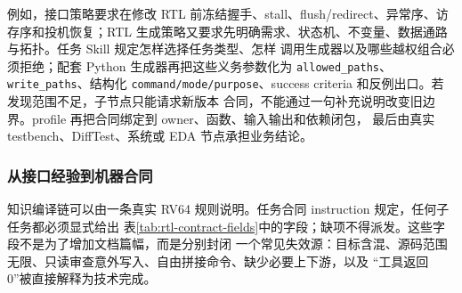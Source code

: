 \documentclass[UTF8,a4paper,zihao=-4,oneside]{ctexart}
\begin{document}
例如，接口策略要求在修改 RTL 前冻结握手、stall、flush/redirect、异常序、访存序和投机恢复；RTL
生成策略又要求先明确需求、状态机、不变量、数据通路与拓扑。任务 Skill 规定怎样选择任务类型、怎样
调用生成器以及哪些越权组合必须拒绝；配套 Python 生成器再把这些义务参数化为
\texttt{allowed\_paths}、\texttt{write\_paths}、结构化
\texttt{command/mode/purpose}、success criteria 和反例出口。若发现范围不足，子节点只能请求新版本
合同，不能通过一句补充说明改变旧边界。profile 再把合同绑定到 owner、函数、输入输出和依赖闭包，
最后由真实 testbench、DiffTest、系统或 EDA 节点承担业务结论。

\newcommand{\TableKnowledgeCompilation}{%
\begin{table}[htbp]
  \centering
  \small
  \caption{专业知识载体在编译链中的分工}
  \label{tab:knowledge-compilation}
  \begin{tabularx}{\linewidth}{@{}L{0.17\linewidth}L{0.28\linewidth}L{0.27\linewidth}Y@{}}
    \toprule
    载体 & 编码的问题 & 进入下一节点的方式 & 单独不能证明什么 \\
    \midrule
    instruction/spec & 架构、接口、Linux 层级、CPI/PPA 全序等不变量 & 由分类与路径选择，并被合同字段、assertion 或 checker 机械化 & 文件存在不等于规则被执行 \\
    Skill & 某类任务的可复用操作、参数、模板和反例出口 & 规定生成、校验、渲染的次序及失败出口 & Skill 自测不等于 DUT 正确 \\
    machine contract & 本轮对象、路径、命令、上下文、成功条件和边界 & 作为 Agent 节点唯一授权与审查基准 & 合同完整不等于工具已经运行 \\
    profile/E2E & 节点 owner、依赖、函数、输入输出和端到端完成条件 & 递归展开闭包并逐节点执行、留证 & 图可展开不等于业务门通过 \\
    oracle/mutation & 如何把 raw observation 转为限定裁决 & 生成正向结果、唯一拒绝 marker 与 receipt & 给定 fault set 被杀死不等于全状态空间完备 \\
    \bottomrule
  \end{tabularx}
\end{table}
}%

\subsubsection{从接口经验到机器合同}

知识编译链可以由一条真实 RV64 规则说明。任务合同 instruction 规定，任何子任务都必须显式给出
表\ref{tab:rtl-contract-fields}中的字段；缺项不得派发。这些字段不是为了增加文档篇幅，而是分别封闭
一个常见失效源：目标含混、源码范围无限、只读审查意外写入、自由拼接命令、缺少必要上下游，以及
“工具返回 0”被直接解释为技术完成。
\end{document}
